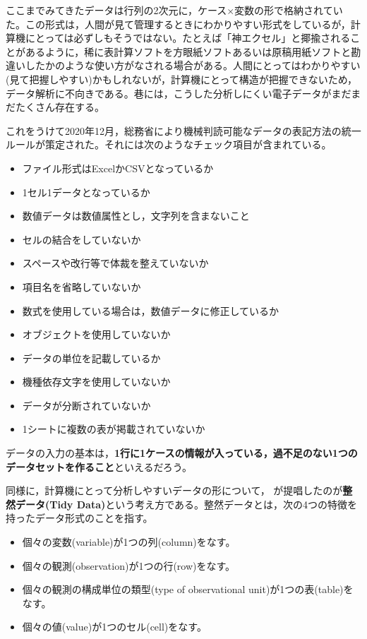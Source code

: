 \documentclass[
  a4paper,
]{ltjsbook}
\providecommand{\tightlist}{%
  \setlength{\itemsep}{0pt}\setlength{\parskip}{0pt}}\usepackage{longtable,booktabs,array}
\begin{document}
ここまでみてきたデータは行列の2次元に，ケース\(\times\)変数の形で格納されていた。この形式は，人間が見て管理するときにわかりやすい形式をしているが，計算機にとっては必ずしもそうではない。たとえば「神エクセル」と揶揄されることがあるように，稀に表計算ソフトを方眼紙ソフトあるいは原稿用紙ソフトと勘違いしたかのような使い方がなされる場合がある。人間にとってはわかりやすい(見て把握しやすい)かもしれないが，計算機にとって構造が把握できないため，データ解析に不向きである。巷には，こうした分析しにくい電子データがまだまだたくさん存在する。

これをうけて2020年12月，総務省により機械判読可能なデータの表記方法の統一ルールが策定された\autocite{soumu}。それには次のようなチェック項目が含まれている。

\begin{itemize}
\tightlist
\item
  ファイル形式はExcelかCSVとなっているか
\item
  1セル1データとなっているか
\item
  数値データは数値属性とし，文字列を含まないこと
\item
  セルの結合をしていないか
\item
  スペースや改行等で体裁を整えていないか
\item
  項目名を省略していないか
\item
  数式を使用している場合は，数値データに修正しているか
\item
  オブジェクトを使用していないか
\item
  データの単位を記載しているか
\item
  機種依存文字を使用していないか
\item
  データが分断されていないか
\item
  1シートに複数の表が掲載されていないか
\end{itemize}

データの入力の基本は，\textbf{1行に1ケースの情報が入っている，過不足のない1つのデータセットを作ること}といえるだろう。

同様に，計算機にとって分析しやすいデータの形について，\autocite{Hadley2014}
が提唱したのが\textbf{整然データ(Tidy
Data)}という考え方である。整然データとは，次の4つの特徴を持ったデータ形式のことを指す。

\begin{itemize}
\tightlist
\item
  個々の変数(variable)が1つの列(column)をなす。
\item
  個々の観測(observation)が1つの行(row)をなす。
\item
  個々の観測の構成単位の類型(type of observational
  unit)が1つの表(table)をなす。
\item
  個々の値(value)が1つのセル(cell)をなす。
\end{itemize}
\end{document}
